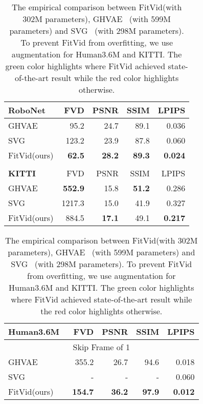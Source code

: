 \documentclass{article}
\newcommand{\model}{FitVid\xspace}
\begin{document}
\begin{table}[t]
\caption{The empirical comparison between \model (with 302M parameters), GHVAE~\cite{wu2021greedy} (with 599M parameters) and SVG~\cite{villegas2019high} (with 298M parameters). To prevent \model from overfitting, we use augmentation for Human3.6M and KITTI.
The green color highlights where \model achieved state-of-the-art result while the red color highlights otherwise.}
\label{tab:results}
\centering
\vspace{0.2cm}
\begin{minipage}{.48\textwidth}
    \centering
    \scriptsize
    \begin{tabular}{lrrrr}\toprule
    \textbf{RoboNet~\cite{dasari2019robonet}} &FVD &PSNR &SSIM &LPIPS \\\midrule
    GHVAE~\cite{wu2021greedy} &95.2 &24.7 &89.1 &0.036 \\
    SVG~\cite{villegas2019high} &123.2 &23.9 &87.8 &0.060 \\
    \model(ours) &\cellcolor[HTML]{d9ead3}\textbf{62.5} &\cellcolor[HTML]{d9ead3}\textbf{28.2} &\cellcolor[HTML]{d9ead3}\textbf{89.3} &\cellcolor[HTML]{d9ead3}\textbf{0.024} \\
    & & & & \\\toprule
    \textbf{KITTI~\cite{geiger2013vision}} &FVD &PSNR &SSIM &LPIPS \\\midrule
    GHVAE~\cite{wu2021greedy} &\cellcolor[HTML]{f4cccc}\textbf{552.9} &15.8 &\cellcolor[HTML]{f4cccc}\textbf{51.2} &0.286 \\
    SVG~\cite{villegas2019high} &1217.3 &15.0 &41.9 &0.327 \\
    \model(ours) &884.5 &\cellcolor[HTML]{d9ead3}\textbf{17.1} &49.1 &\cellcolor[HTML]{d9ead3}\textbf{0.217} \\
    \bottomrule
    \end{tabular}
\end{minipage}\hfill
\begin{minipage}{.48\textwidth}
    \centering
    \scriptsize
    \begin{tabular}{lrrrr}\toprule
    \textbf{Human3.6M~\cite{ionescu2014human3}} &FVD &PSNR &SSIM &LPIPS \\\midrule
    \multicolumn{5}{c}{Skip Frame of 1}\\\midrule
    GHVAE~\cite{wu2021greedy} &355.2 &26.7 &94.6 &0.018 \\
    SVG~\cite{villegas2019high} &- &- &- &0.060 \\
    \model(ours) &\cellcolor[HTML]{d9ead3}\textbf{154.7} &\cellcolor[HTML]{d9ead3}\textbf{36.2} &\cellcolor[HTML]{d9ead3}\textbf{97.9} &\cellcolor[HTML]{d9ead3}\textbf{0.012} \\\midrule

\end{tabular}
\end{minipage}
\end{table}
\end{document}
